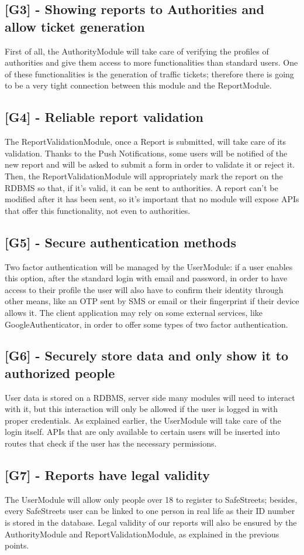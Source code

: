 \subsection{[G3] - Showing reports to Authorities and allow ticket generation}
First of all, the AuthorityModule will take care of verifying the profiles of authorities and give them access to more functionalities than standard users. 
One of these functionalities is the generation of traffic tickets; therefore there is going to be a very tight connection between this module and the ReportModule.
\subsection{[G4] - Reliable report validation}
The ReportValidationModule, once a Report is submitted, will take care of its validation.
Thanks to the Push Notifications, some users will be notified of the new report and will be asked to submit a form in order to validate it or reject it.
Then, the ReportValidationModule will appropriately mark the report on the RDBMS so that, if it's valid, it can be sent to authorities.
A report can't be modified after it has been sent, so it's important that no module will expose APIs that offer this functionality, not even to authorities.
\subsection{[G5] - Secure authentication methods}
Two factor authentication will be managed by the UserModule: if a user enables this option, after the standard login with email and password, in order to have access to their profile the user will also have to confirm their identity through other means, like an OTP sent by SMS or email or their fingerprint if their device allows it.
The client application may rely on some external services, like GoogleAuthenticator, in order to offer some types of two factor authentication.
\subsection{[G6] - Securely store data and only show it to authorized people}
User data is stored on a RDBMS, server side many modules will need to interact with it, but this interaction will only be allowed if the user is logged in with proper credentials.
As explained earlier, the UserModule will take care of the login itself. 
APIs that are only available to certain users will be inserted into routes that check if the user has the necessary permissions.
\subsection{[G7] - Reports have legal validity}
The UserModule will allow only people over 18 to register to SafeStreets; besides, every SafeStreets user can be linked to one person in real life as their ID number is stored in the database. Legal validity of our reports will also be ensured by the AuthorityModule and ReportValidationModule, as explained in the previous points.